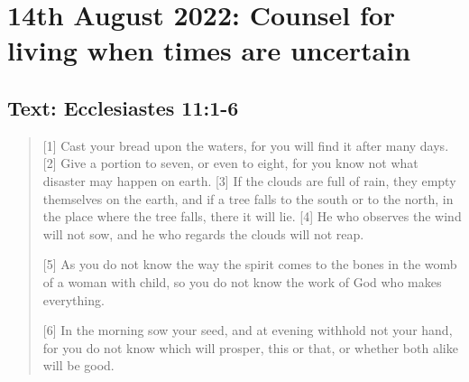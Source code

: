 \section{14th August 2022: Counsel for living when times are uncertain}
\subsection*{Text: Ecclesiastes 11:1-6}
  \begin{quote}
    [1] Cast your bread upon the waters,
        for you will find it after many days.
    [2] Give a portion to seven, or even to eight,
        for you know not what disaster may happen on earth.
    [3] If the clouds are full of rain,
        they empty themselves on the earth,
    and if a tree falls to the south or to the north,
        in the place where the tree falls, there it will lie.
    [4] He who observes the wind will not sow,
        and he who regards the clouds will not reap.

    [5] As you do not know the way the spirit comes to the bones in the womb
    of a woman with child, so you do not know the work of God who makes
    everything.

    [6] In the morning sow your seed, and at evening withhold not your hand,
    for you do not know which will prosper, this or that, or whether both
    alike will be good.
  \end{quote}
